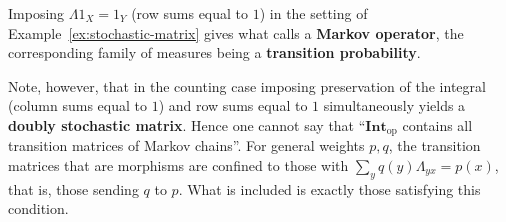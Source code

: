 \begin{remark}
  Imposing $\Lambda1_X=1_Y$ (row sums equal to $1$) in the setting of
  Example~\ref{ex:stochastic-matrix} gives what \cite{Yamagami} calls a
  \textbf{Markov operator}, the corresponding family of measures being a
  \textbf{transition probability}.

  Note, however, that in the counting case imposing preservation of the integral
  (column sums equal to $1$) and row sums equal to $1$ simultaneously yields a
  \textbf{doubly stochastic matrix}.
  Hence one cannot say that ``$\mathbf{Int}_{\mathrm{op}}$ contains all
  transition matrices of Markov chains''.
  For general weights $p,q$, the transition matrices that are morphisms are
  confined to those with $\sum_{y}q(y)\Lambda_{yx}=p(x)$, that is, those sending
  $q$ to $p$.
  What is included is exactly those satisfying this condition.
\end{remark}
